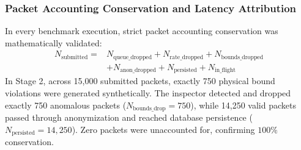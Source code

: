 \documentclass[a4paper]{article}
\begin{document}
\begin{table}[H]
\centering
\caption{Rate-Controlled End-to-End Pipeline Evaluation (Category 4)}
\label{tab:e2e_results}
\small
{}
\end{table}

\subsubsection{Packet Accounting Conservation and Latency Attribution}
In every benchmark execution, strict packet accounting conservation was mathematically validated:
\begin{equation}
\begin{aligned}
N_{\text{submitted}} ={} & N_{\text{queue\_dropped}} + N_{\text{rate\_dropped}} + N_{\text{bounds\_dropped}} \\
& + N_{\text{anon\_dropped}} + N_{\text{persisted}} + N_{\text{in\_flight}}
\end{aligned}
\end{equation}
In Stage 2, across 15,000 submitted packets, exactly 750 physical bound violations were generated synthetically. The inspector detected and dropped exactly 750 anomalous packets ($N_{\text{bounds\_drop}} = 750$), while 14,250 valid packets passed through anonymization and reached database persistence ($N_{\text{persisted}} = 14,250$). Zero packets were unaccounted for, confirming $100\%$ conservation.
\end{document}
